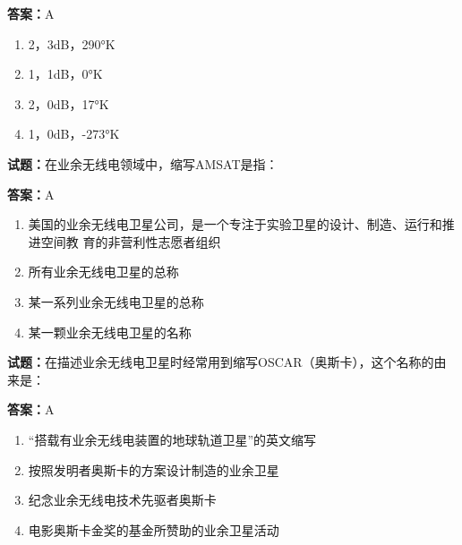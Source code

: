 \documentclass{ctexbook}
\begin{document}
\textbf{答案：}A 

\begin{enumerate}[leftmargin=3em]
  \item 2，3dB，290°K 

  \item 1，1dB，0°K 

  \item 2，0dB，17°K 

  \item 1，0dB，-273°K 

\end{enumerate}





\vspace{1em}

\textbf{试题：}在业余无线电领域中，缩写AMSAT是指： 

\textbf{答案：}A 

\begin{enumerate}[leftmargin=3em]
  \item 美国的业余无线电卫星公司，是一个专注于实验卫星的设计、制造、运行和推进空间教
育的非营利性志愿者组织 

  \item 所有业余无线电卫星的总称 

  \item 某一系列业余无线电卫星的总称 

  \item 某一颗业余无线电卫星的名称 

\end{enumerate}





\vspace{1em}

\textbf{试题：}在描述业余无线电卫星时经常用到缩写OSCAR（奥斯卡），这个名称的由来是： 

\textbf{答案：}A 

\begin{enumerate}[leftmargin=3em]
  \item “搭载有业余无线电装置的地球轨道卫星”的英文缩写 

  \item 按照发明者奥斯卡的方案设计制造的业余卫星 

  \item 纪念业余无线电技术先驱者奥斯卡 

  \item 电影奥斯卡金奖的基金所赞助的业余卫星活动 

\end{enumerate}
\end{document}
